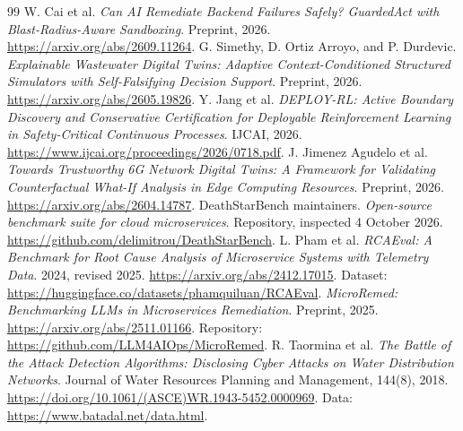 ﻿\documentclass[sigconf,nonacm]{acmart}
\begin{document}
\begin{thebibliography}{99}
 W. Cai et al. \emph{Can AI Remediate Backend Failures Safely? GuardedAct with Blast-Radius-Aware Sandboxing}. Preprint, 2026. \url{https://arxiv.org/abs/2609.11264}.
 G. Simethy, D. Ortiz Arroyo, and P. Durdevic. \emph{Explainable Wastewater Digital Twins: Adaptive Context-Conditioned Structured Simulators with Self-Falsifying Decision Support}. Preprint, 2026. \url{https://arxiv.org/abs/2605.19826}.
 Y. Jang et al. \emph{DEPLOY-RL: Active Boundary Discovery and Conservative Certification for Deployable Reinforcement Learning in Safety-Critical Continuous Processes}. IJCAI, 2026. \url{https://www.ijcai.org/proceedings/2026/0718.pdf}.
 J. Jimenez Agudelo et al. \emph{Towards Trustworthy 6G Network Digital Twins: A Framework for Validating Counterfactual What-If Analysis in Edge Computing Resources}. Preprint, 2026. \url{https://arxiv.org/abs/2604.14787}.
 DeathStarBench maintainers. \emph{Open-source benchmark suite for cloud microservices}. Repository, inspected 4 October 2026. \url{https://github.com/delimitrou/DeathStarBench}.
 L. Pham et al. \emph{RCAEval: A Benchmark for Root Cause Analysis of Microservice Systems with Telemetry Data}. 2024, revised 2025. \url{https://arxiv.org/abs/2412.17015}. Dataset: \url{https://huggingface.co/datasets/phamquiluan/RCAEval}.
 \emph{MicroRemed: Benchmarking LLMs in Microservices Remediation}. Preprint, 2025. \url{https://arxiv.org/abs/2511.01166}. Repository: \url{https://github.com/LLM4AIOps/MicroRemed}.
 R. Taormina et al. \emph{The Battle of the Attack Detection Algorithms: Disclosing Cyber Attacks on Water Distribution Networks}. Journal of Water Resources Planning and Management, 144(8), 2018. \url{https://doi.org/10.1061/(ASCE)WR.1943-5452.0000969}. Data: \url{https://www.batadal.net/data.html}.
\end{thebibliography}
\end{document}
